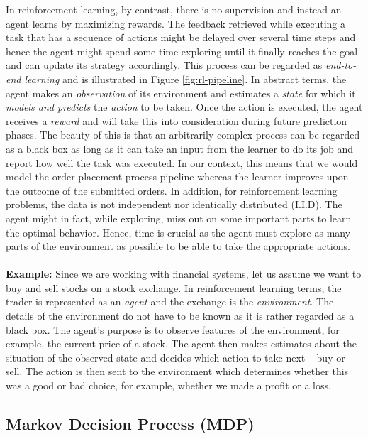 In reinforcement learning, by contrast, there is no supervision and instead an agent learns by maximizing rewards.
The feedback retrieved while executing a task that has a sequence of actions might be delayed over several time steps and hence the agent might spend some time exploring until it finally reaches the goal and can update its strategy accordingly.
This process can be regarded as \textit{end-to-end learning} and is illustrated in Figure \ref{fig:rl-pipeline}.
In abstract terms, the agent makes an \textit{observation} of its environment and estimates a \textit{state} for which it \textit{models and predicts} the \textit{action} to be taken.
Once the action is executed, the agent receives a \textit{reward} and will take this into consideration during future prediction phases. 
The beauty of this is that an arbitrarily complex process can be regarded as a black box as long as it can take an input from the learner to do its job and report how well the task was executed.
In our context, this means that we would model the order placement process pipeline whereas the learner improves upon the outcome of the submitted orders.
In addition, for reinforcement learning problems, the data is not independent nor identically distributed (I.I.D). 
The agent might in fact, while exploring, miss out on some important parts to learn the optimal behavior. 
Hence, time is crucial as the agent must explore as many parts of the environment as possible to be able to take the appropriate actions. \cite{rl-demystified}
\\
\\
\textbf{Example:} Since we are working with financial systems, let us assume we want to buy and sell stocks on a stock exchange. 
In reinforcement learning terms, the trader is represented as an \textit{agent} and the exchange is the \textit{environment}.
The details of the environment do not have to be known as it is rather regarded as a black box.
The agent's purpose is to observe features of  the environment, for example, the current price of a stock.
The agent then makes estimates about the situation of the observed state and decides which action to take next – buy or sell. 
The action is then sent to the environment which determines whether this was a good or bad choice, for example, whether we made a profit or a loss.

\subsection{Markov Decision Process (MDP)}
\label{rl-mdp}

